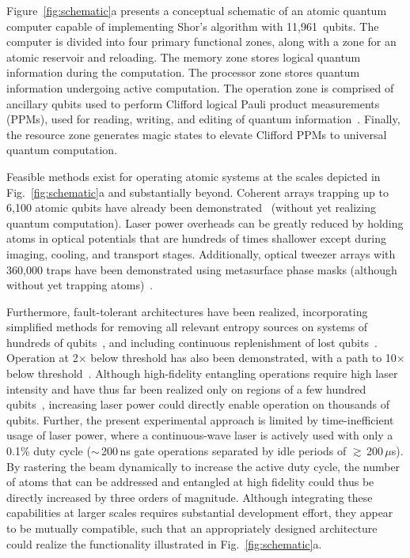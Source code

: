 \documentclass[reprint,twocolumn,secnumarabic,amssymb, aps, prx]{revtex4-2}
\newcommand{\nbalancedmed}{11,961}
\begin{document}
Figure~\ref{fig:schematic}a presents a conceptual schematic of an atomic quantum computer capable of implementing Shor's algorithm with \nbalancedmed\ qubits. The computer is divided into four primary functional zones, along with a zone for an atomic reservoir and reloading. The memory zone stores logical quantum information during the computation. The processor zone stores quantum information undergoing active computation. The operation zone is comprised of ancillary qubits used to perform Clifford logical  Pauli product measurements (PPMs), used for reading, writing, and editing of quantum information~\cite{cross2024improved, cowtan2025fast, li2025transversal, xu2025fast, zheng2025high}. Finally, the resource zone generates magic states to elevate Clifford PPMs to universal quantum computation. 

Feasible methods exist for operating atomic systems at the scales depicted in Fig.~\ref{fig:schematic}a and substantially beyond. Coherent arrays trapping up to 6,100 atomic qubits have already been demonstrated~\cite{manetsch2025tweezer} (without yet realizing quantum computation). Laser power overheads can be greatly reduced by holding atoms in optical potentials that are hundreds of times shallower except during imaging, cooling, and transport stages. Additionally, optical tweezer arrays with 360,000 traps have been demonstrated using metasurface phase masks (although without yet trapping atoms)~\cite{holman2026trapping}.

Furthermore, fault-tolerant architectures have been realized, incorporating simplified methods for removing all relevant entropy sources on systems of hundreds of qubits~\cite{bluvstein2025architectural}, and including continuous replenishment of lost qubits~\cite{gyger2024continuous,norcia2024iterative,chiu2025continuous}. Operation at 2$\times$ below threshold has also been demonstrated, with a path to 10$\times$ below threshold~\cite{bluvstein2025architectural}. Although high-fidelity entangling operations require high laser intensity and have thus far been realized only on regions of a few hundred qubits~\cite{evered2023high, ma2023high,lis2023midcircuit, tsai2025benchmarking, bluvstein2025architectural}, increasing laser power could directly enable operation on thousands of qubits. Further, the present experimental approach is limited by time-inefficient usage of laser power, where a continuous-wave laser is actively used with only a 0.1\% duty cycle ($\sim$\,200\,ns gate operations separated by idle periods of $\gtrsim$\,200\,$\mu$s). By rastering the beam dynamically to increase the active duty cycle, the number of atoms that can be addressed and entangled at high fidelity could thus be directly increased by three orders of magnitude. Although integrating these capabilities at larger scales requires substantial development effort, they appear to be mutually compatible, such that an appropriately designed architecture could realize the functionality illustrated in Fig.~\ref{fig:schematic}a.
\end{document}
